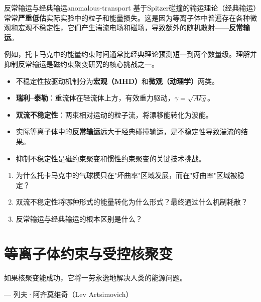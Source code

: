\documentclass[12pt,a4paper,openany,oneside]{book}
\begin{document}
\begin{warning}{反常输运与经典输运}{anomalous-transport}
基于Spitzer碰撞的输运理论（经典输运）常常\textbf{严重低估}实际实验中的粒子和能量损失。这是因为等离子体中普遍存在各种微观和宏观不稳定性，它们产生湍流电场和磁场，导致额外的随机散射——\textbf{反常输运}。

例如，托卡马克中的能量约束时间通常比经典理论预测短一到两个数量级。理解并抑制反常输运是磁约束聚变研究的核心挑战之一。
\end{warning}

\begin{chapterreview}
\begin{itemize}
\item 不稳定性按驱动机制分为\textbf{宏观（MHD）}和\textbf{微观（动理学）}两类。
\item \textbf{瑞利--泰勒}：重流体在轻流体上方，有效重力驱动，$\gamma = \sqrt{Akg}$。
\item \textbf{双流不稳定性}：两束相对运动的粒子流，将漂移能转化为波能。
\item 实际等离子体中的\textbf{反常输运}远大于经典碰撞输运，是不稳定性导致湍流的结果。
\item 抑制不稳定性是磁约束聚变和惯性约束聚变的关键技术挑战。
\end{itemize}
\end{chapterreview}

\begin{miniquiz}
\begin{enumerate}
\item 为什么托卡马克中的气球模只在"坏曲率"区域发展，而在"好曲率"区域被稳定？
\item 双流不稳定性将哪种形式的能量转化为什么形式？最终通过什么机制耗散？
\item 反常输运与经典输运的根本区别是什么？
\end{enumerate}
\end{miniquiz}


\chapter{等离子体约束与受控核聚变}
\epigraph{如果核聚变能成功，它将一劳永逸地解决人类的能源问题。}{--- 列夫·阿齐莫维奇（Lev Artsimovich）}
\end{document}
